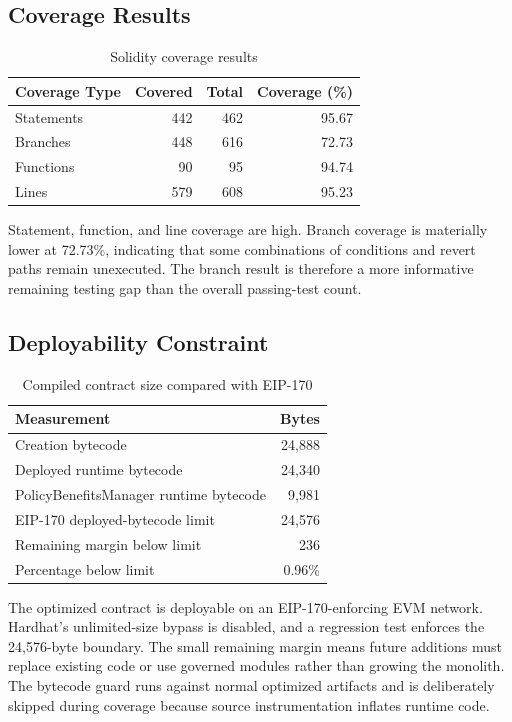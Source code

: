 \subsection{Coverage Results}

\begin{table}[htbp]
\centering
\caption{Solidity coverage results}
\label{tab:coverage_results}
\begin{tabular}{|p{4.0cm}|r|r|r|}
\hline
\textbf{Coverage Type} & \textbf{Covered} & \textbf{Total} &
\textbf{Coverage (\%)} \\
\hline
Statements & 442 & 462 & 95.67 \\
\hline
Branches & 448 & 616 & 72.73 \\
\hline
Functions & 90 & 95 & 94.74 \\
\hline
Lines & 579 & 608 & 95.23 \\
\hline
\end{tabular}
\end{table}

Statement, function, and line coverage are high. Branch coverage is materially
lower at 72.73\%, indicating that some combinations of conditions and revert
paths remain unexecuted. The branch result is therefore a more informative
remaining testing gap than the overall passing-test count.

\subsection{Deployability Constraint}

\begin{table}[htbp]
\centering
\caption{Compiled contract size compared with EIP-170}
\label{tab:contract_size}
\begin{tabular}{|p{6.0cm}|r|}
\hline
\textbf{Measurement} & \textbf{Bytes} \\
\hline
Creation bytecode & 24,888 \\
\hline
Deployed runtime bytecode & 24,340 \\
\hline
PolicyBenefitsManager runtime bytecode & 9,981 \\
\hline
EIP-170 deployed-bytecode limit & 24,576 \\
\hline
Remaining margin below limit & 236 \\
\hline
Percentage below limit & 0.96\% \\
\hline
\end{tabular}
\end{table}

The optimized contract is deployable on an EIP-170-enforcing EVM network.
Hardhat's unlimited-size bypass is disabled, and a regression test enforces the
24,576-byte boundary. The small remaining margin means future additions must
replace existing code or use governed modules rather than growing the monolith.
The bytecode guard runs against normal optimized artifacts and is deliberately
skipped during coverage because source instrumentation inflates runtime code.

